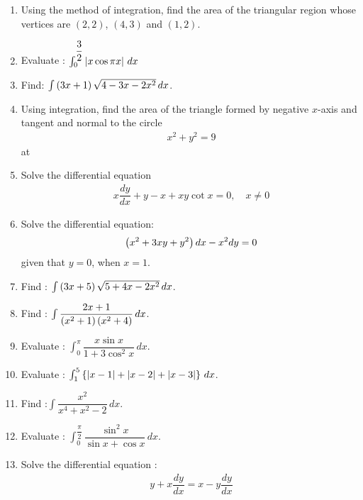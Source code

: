 \begin{enumerate}
    \item Using the method of integration, find the area of the triangular region whose vertices are $(2, 2)$, $(4, 3)$ and $(1, 2)$.
    \item Evaluate : $\int_{0}^{\dfrac{3}{2}} \left\vert x \cos \pi x\right\vert\,dx$
    \item Find: $\int \left(3x +1\right)\sqrt{4-3x-2x^2} \,dx$.
    \item Using integration, find the area of the triangle formed by negative $x$-axis and tangent and normal to the circle
          \begin{align*}
              x^2 + y^2 =9
          \end{align*}
          at 
    \item Solve the differential equation
          \begin{align*}
              x\dfrac{dy}{dx} +y -x +xy \cot x= 0, \quad x\neq 0
          \end{align*}
    \item Solve the differential equation:
          \begin{align*}
              \left(x^2+3xy+y^2\right)dx -x^2dy = 0
          \end{align*}
          given that $y=0$, when $x=1$.
    \item Find : $\int \left(3x+5\right)\sqrt{5+4x-2x^2}\,dx$.
    \item Find : $\int \dfrac{2x+1}{\left(x^2+1\right)\left(x^2+4\right)}\,dx$.
    \item Evaluate : $\int_{0}^{\pi}\dfrac{x\sin x}{1+3\cos^2 x}\,dx$.
    \item Evaluate : $\int_{1}^{5}\left\{\left\vert x-1\right\vert+\left\vert x-2\right\vert+\left\vert x-3\right\vert\right\}\,dx$.
    \item Find :$\int \dfrac{x^2}{x^4 + x^2 -2}\,dx$.
    \item Evaluate : $\int_{0}^{\dfrac{\pi}{2}} \dfrac{\sin^2 x}{\sin x + \cos x} \,dx$.
    \item Solve the differential equation :
          \begin{align*}
              y+ x\dfrac{dy}{dx} = x-y\dfrac{dy}{dx}
          \end{align*}


\end{enumerate}
